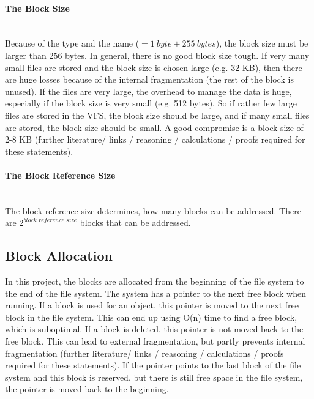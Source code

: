 \documentclass[a4paper,12pt]{article}
\begin{document}
\paragraph{The Block Size} ~\\

\noindent Because of the type and the name ($ = 1\ byte + 255\ bytes$), the block size must be larger than 256 bytes. In general, there is no good block size tough. If very many small files are stored and the block size is chosen  large (e.g. 32 KB), then there are huge losses because of the internal fragmentation (the rest of the block is unused). If the files are very large, the overhead to manage the data is huge, especially if the block size is very small (e.g. 512 bytes). So if rather few large files are stored in the VFS, the block size should be large, and if many small files are stored, the block size should be small. A good compromise is a block size of 2-8 KB (further literature/ links / reasoning / calculations / proofs required for these statements).

\paragraph{The Block Reference Size} ~\\

\noindent The block reference size determines, how many blocks can be addressed. There are $2^{block\_reference\_size}$ blocks that can be addressed.

\subsection{Block Allocation}

In this project, the blocks are allocated from the beginning of the file system to the end of the file system. The system has a pointer to the next free block when running. If a block is used for an object, this pointer is moved to the next free block in the file system. This can end up using O(n) time to find a free block, which is suboptimal. If a block is deleted, this pointer is not moved back to the free block. This can lead to external fragmentation, but partly prevents internal fragmentation (further literature/ links / reasoning / calculations / proofs required for these statements). If the pointer points to the last block of the file system and this block is reserved, but there is still free space in the file system, the pointer is moved back to the beginning.
\end{document}
